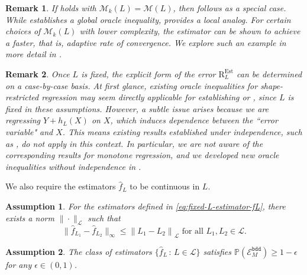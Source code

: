 \documentclass[12pt]{article}
\newtheorem{remark}{Remark}[section]
\newtheorem{assumption}{Assumption}[section]
\begin{document}
\begin{remark}
    If  holds with $\mathcal{M}_k(L) = \mathcal{M}(L)$, then  follows as a special case. While  establishes a global oracle inequality,  provides a local analog. For certain choices of $\mathcal{M}_k(L)$ with lower complexity, the estimator can be shown to achieve a faster, that is, adaptive rate of convergence. We explore such an example in more detail in .
\end{remark}
\begin{remark}
Once $L$ is fixed, the explicit form of the error $\mathrm{R}_{L}^{\mathrm{Est}}$ can be determined on a case-by-case basis. At first glance, existing oracle inequalities for shape-restricted regression may seem directly applicable for establishing  or , since $L$ is fixed in these assumptions. However, a subtle issue arises because we are regressing $Y + h_L(X)$ on $X$, which induces dependence between the ``error variable" and $X$. This means existing results established under independence, such as  \cite{zhang2002risk, chatterjee2015risk, bellec2018sharp, han2019convergence}, do not apply in this context. In particular, we are not aware of the corresponding results for monotone regression, and we developed new oracle inequalities without independence in .
\end{remark}
 We also require the estimators $\widehat{f}_L$ to be continuous in $L$.
\begin{assumption}For the estimators defined in \eqref{eq:fixed-L-estimator-fL}, there exists a norm $\|\cdot\|_{\mathcal{L}}$ such that
\label{as:Lipschitz-in-parameter}
\begin{equation}
        \|\widehat{f}_{L_1}-\widehat{f}_{L_2}\|_{\infty} \le \left\|L_1-L_2\right\|_{\mathcal{L}} \text { for all } L_1, L_2 \in \mathcal{L}.
\end{equation}
\end{assumption}

\begin{assumption}\label{as:stochastic-bounded}
The class of estimators $\{\widehat f_L\, :\, L\in\mathcal{L}\}$ satisfies $\mathbb{P}\left(\mathcal{E}_M^{\mathtt{bdd}}\right) \geq 1-\epsilon$ for any $\epsilon \in (0,1)$.
\end{assumption}
\end{document}
